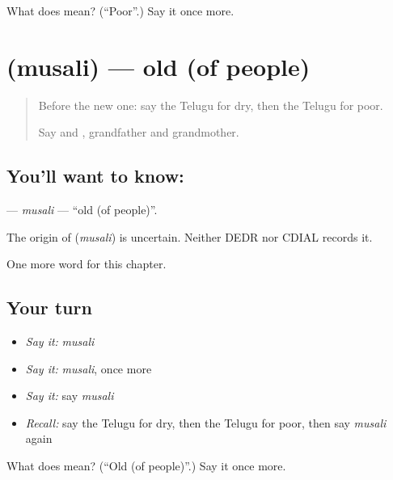 \begin{tcolorbox}[breakable,colback=teal!4,colframe=teal!35!black,title={Before you move on}]
What does  mean? (\textquotedblleft{}Poor\textquotedblright{}.) Say it once more.
\end{tcolorbox}
\section[\texorpdfstring{\te{ముసలి} (musali)}{ముసలి (musali)}]{ (musali) — old (of people)}

\label{lesson:TE-C139-musali}



\begin{quote}
Before the new one: say the Telugu for dry, then the Telugu for poor.

Say \textbf{} and \textbf{}, grandfather and grandmother.
\end{quote}

\subsection*{You'll want to know: }
\textbf{} — \emph{musali} — \textquotedblleft{}old (of people)\textquotedblright{}.

\begin{cousinweb}
The origin of \textbf{} (\emph{musali}) is uncertain. Neither DEDR nor CDIAL records it.
\end{cousinweb}

\begin{grammarlens}[title={What you've built}]
One more word for this chapter.
\end{grammarlens}

\subsection*{Your turn}
\begin{itemize}
\raggedright
  \item \emph{Say it:} \emph{musali}
  \item \emph{Say it:} \emph{musali}, once more
  \item \emph{Say it:} say \emph{musali}
  \item \emph{Recall:} say the Telugu for dry, then the Telugu for poor, then say \emph{musali} again
\end{itemize}

\begin{tcolorbox}[breakable,colback=teal!4,colframe=teal!35!black,title={Before you move on}]
What does  mean? (\textquotedblleft{}Old (of people)\textquotedblright{}.) Say it once more.
\end{tcolorbox}

